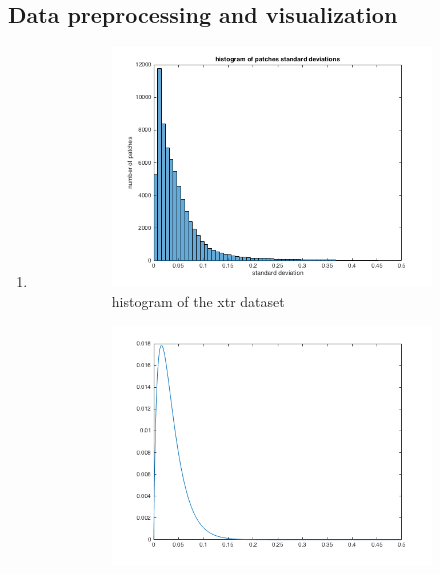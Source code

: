 \documentclass{article}
\begin{document}
		\subsection{Data preprocessing and visualization}
			 \begin{enumerate}[label=(\alph*)]
			 	\item
				 	\begin{figure}[t]
				 		\centering
				 		\caption{standard deviations in the xtr dataset}
				 		\label{fig:patch_images}
				 		\begin{subfigure}{0.5\textwidth}
				 			\includegraphics[width=\linewidth]{images/p1-1-a_std_hist}
				 			\caption{histogram of the xtr dataset}
				 			\label{fig:p1-1-a_std_hist}
				 		\end{subfigure}%
				 		\begin{subfigure}{0.5\textwidth}
				 			\includegraphics[width=\linewidth]{images/p1-1-a_dist}

\end{subfigure}
\end{figure}
\end{enumerate}
\end{document}
